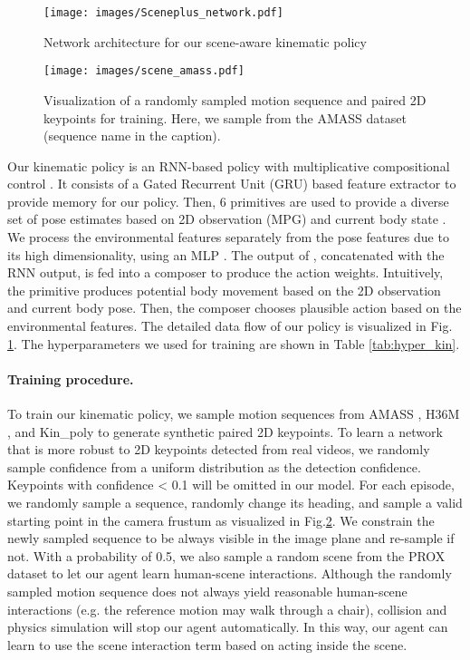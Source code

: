 \begin{figure}[t]
    \centering
    \texttt{[image: images/Sceneplus\_network.pdf]}
    \caption{Network architecture for our scene-aware kinematic policy }
    \label{fig:policy}
\end{figure}

\begin{figure}[h]
\label{fig:amass_train}
\centering
\texttt{[image: images/scene\_amass.pdf]}
\caption{Visualization of a randomly sampled motion sequence and paired 2D keypoints for training. Here, we sample from the AMASS dataset (sequence name in the caption).}
\end{figure}


Our kinematic policy is an RNN-based policy with multiplicative compositional control \cite{Peng2019MCPLC}. It consists of a Gated Recurrent Unit (GRU)\cite{Cho2014LearningPR} based feature extractor to provide memory for our policy. Then, 6 primitives  are used to provide a diverse set of pose estimates based on 2D observation  (MPG) and current body state . We process the environmental features separately from the pose features due to its high dimensionality, using an MLP .  The output of , concatenated with the RNN output, is fed into a composer  to produce the action weights. Intuitively, the primitive produces potential body movement based on the 2D observation and current body pose. Then, the composer chooses plausible action based on the environmental features. The detailed data flow of our policy is visualized in Fig. \ref{fig:policy}. The hyperparameters we used for training are shown in Table \ref{tab:hyper_kin}. 





\paragraph{Training procedure.}

To train our kinematic policy, we sample motion sequences from AMASS \cite{Mahmood2019AMASSAO}, H36M \cite{h36m_pami}, and Kin\_poly \cite{Luo20203DHM} to generate synthetic paired 2D keypoints. To learn a network that is more robust to 2D keypoints detected from real videos, we randomly sample confidence from a uniform  distribution as the detection confidence. Keypoints with confidence < 0.1 will be omitted in our model. For each episode, we randomly sample a sequence, randomly change its heading, and sample a valid starting point in the camera frustum as visualized in Fig.\ref{fig:amass_train}. We constrain the newly sampled sequence to be always visible in the image plane and re-sample if not. With a probability of 0.5, we also sample a random scene from the PROX dataset to let our agent learn human-scene interactions. Although the randomly sampled motion sequence does not always yield reasonable human-scene interactions (e.g. the reference motion may walk through a chair), collision and physics simulation will stop our agent automatically. In this way, our agent can learn to use the scene interaction term based on acting inside the scene. 


